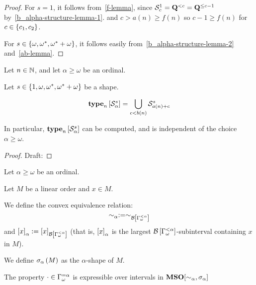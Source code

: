 \begin{proof}
  For $s = 1$, it follows from~\cref{f-lemma}, since $\mathcal{S}^{1}_{c} = \mathbf{Q}^{< c} = \mathbf{Q}^{\le c-1}$
  by~\cref{b_alpha-structure-lemma-1}.
  and $c > a(n) \ge f(n)$ so $c-1 \ge f(n)$ for $c \in \left\{ {c_1, c_2} \right\}$.

  For $s \in \left\{ {\omega, \omega^\ast, \omega^\ast + \omega} \right\}$, it follows easily from~\cref{b_alpha-structure-lemma-2}
  and~\cref{ab-lemma}.
\end{proof}

\begin{lemma}
  Let $n \in \mathbb{N}$, and let $\alpha \ge \omega$ be an ordinal.

  Let $s \in \left\{ {1, \omega, \omega^\ast, \omega^\ast + \omega} \right\}$ be a shape.

  \[\mathbf{type}_{n} \left[ {\mathcal{S}^{s}_{\alpha}} \right] = \bigcup_{c < b(n)}{\mathcal{S}^{s}_{a(n) + c}                                                                                                                                                                                                                                                                                                                                                                                                                                       }\]

  In particular, $\mathbf{type}_{n} \left[ {\mathcal{S}^{s}_{\alpha}} \right]$ can be
  computed, and is independent of the choice $\alpha \ge \omega$.
\end{lemma}

\begin{proof}
  Draft:
  
\end{proof}

\begin{definition}
  Let $\alpha \ge \omega$ be an ordinal.

  Let $M$ be a linear order and $x \in M$.

  We define the convex equivalence relation: 
  \[\sim_\alpha := \sim_{\mathcal{B} \left[ {{\Gamma_{\omega}^{< \alpha}}} \right]}\]
  and $\left[ {x} \right]_{\alpha} := \left[ {x} \right]_{\mathcal{B} \left[ {{\Gamma_{\omega}^{< \alpha}}} \right]}$ (that is,
  $\left[ {x} \right]_{\alpha}$ is the largest $\mathcal{B} \left[ {{\Gamma_{\omega}^{< \alpha}}} \right]$-subinterval
  containing $x$ in $M$).

  We define $\sigma_{\alpha} \left( {M} \right)$ as
  the $\alpha$-shape of $M$.
\end{definition}


\begin{lemma}
  The property
  $\cdot \in \Gamma_{\omega}^{= \alpha}$ is expressible over intervals
  in $\mathbf{MSO}[\sim_{\alpha}, \sigma_{\alpha}]$
\end{lemma}

